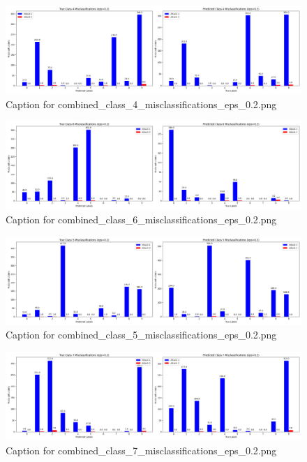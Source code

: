 \documentclass[11pt,onside]{article}
\begin{document}
\begin{figure}[ht]
\centering
\includegraphics[width=1\textwidth]{combined_class_boundary_pgd/combined_class_4_misclassifications_eps_0.2.png}
\caption{Caption for combined_class_4_misclassifications_eps_0.2.png}
\label{fig:combined_class_4_misclassifications_eps_0.2.png}
\end{figure}

\begin{figure}[ht]
\centering
\includegraphics[width=1\textwidth]{combined_class_boundary_pgd/combined_class_6_misclassifications_eps_0.2.png}
\caption{Caption for combined_class_6_misclassifications_eps_0.2.png}
\label{fig:combined_class_6_misclassifications_eps_0.2.png}
\end{figure}

\begin{figure}[ht]
\centering
\includegraphics[width=1\textwidth]{combined_class_boundary_pgd/combined_class_5_misclassifications_eps_0.2.png}
\caption{Caption for combined_class_5_misclassifications_eps_0.2.png}
\label{fig:combined_class_5_misclassifications_eps_0.2.png}
\end{figure}

\begin{figure}[ht]
\centering
\includegraphics[width=1\textwidth]{combined_class_boundary_pgd/combined_class_7_misclassifications_eps_0.2.png}
\caption{Caption for combined_class_7_misclassifications_eps_0.2.png}
\label{fig:combined_class_7_misclassifications_eps_0.2.png}
\end{figure}
\end{document}
